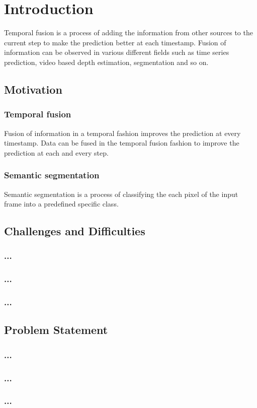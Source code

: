 

    \chapter{Introduction}
	
	Temporal fusion is a process of adding the information from other sources to the current step to make the prediction better at each timestamp. Fusion of information can be observed in various different fields such as time series prediction, video based depth estimation, segmentation and so on.
	
    \section{Motivation}
    \subsection{Temporal fusion}

    Fusion of information in a temporal fashion improves the prediction at every timestamp. Data can be fused in the temporal fusion fashion to improve the prediction at each and every step.

    \subsection{Semantic segmentation}
	
	Semantic segmentation is a process of classifying the each pixel of the input frame into a predefined specific class.  

    \section{Challenges and Difficulties}
    \subsection{...}

    \lipsum[11-15]

    \subsection{...}

    \subsection{...}



    \section{Problem Statement}
    \subsection{...}

    \lipsum[21-30]

    \subsection{...}


    \subsection{...}

